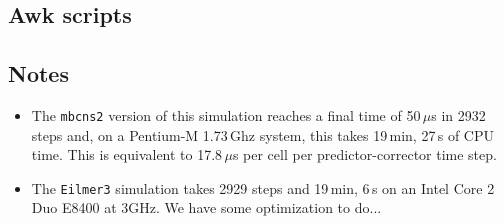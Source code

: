 \newpage
\subsection{Awk scripts}
\label{bar-awk-files}
\topbar

\bottombar

\noindent
\topbar

\bottombar


\subsection{Notes}
\begin{itemize}
\item The \texttt{mbcns2} version of this simulation 
      reaches a final time of 50\,$\mu$s in 2932 steps and,
      on a Pentium-M 1.73\,Ghz system, this takes 19\,min, 27\,s of CPU time.
      This is equivalent to 17.8\,$\mu$s per cell per predictor-corrector
      time step.
\item The \texttt{Eilmer3} simulation takes 2929 steps and 19\,min, 6\,s on 
      an Intel Core 2 Duo E8400 at 3GHz.
      We have some optimization to do...
\end{itemize}
